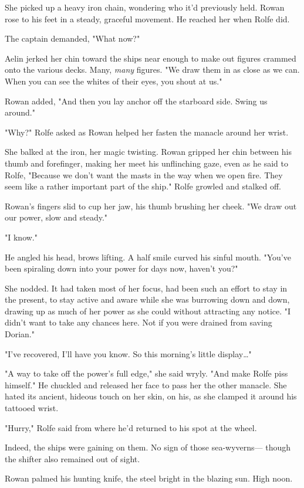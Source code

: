 She picked up a heavy iron chain, wondering who it'd previously held.
Rowan rose to his feet in a steady, graceful movement.
He reached her when Rolfe did.

The captain demanded, "What now?"

Aelin jerked her chin toward the ships near enough to make out figures crammed onto the various decks.
Many, \emph{many} figures.
"We draw them in as close as we can.
When you can see the whites of their eyes, you shout at us."

Rowan added, "And then you lay anchor off the starboard side.
Swing us around."

"Why?"
Rolfe asked as Rowan helped her fasten the manacle around her wrist.

She balked at the iron, her magic twisting.
Rowan gripped her chin between his thumb and forefinger, making her meet his unflinching gaze, even as he said to Rolfe, "Because we don't want the masts in the way when we open fire.
They seem like a rather important part of the ship."
Rolfe growled and stalked off.

Rowan's fingers slid to cup her jaw, his thumb brushing her cheek.
"We draw out our power, slow and steady."

"I know."

He angled his head, brows lifting.
A half smile curved his sinful mouth.
"You've been spiraling down into your power for days now, haven't you?"

She nodded.
It had taken most of her focus, had been such an effort to stay in the present, to stay active and aware while she was burrowing down and down, drawing up as much of her power as she could without attracting any notice.
"I didn't want to take any chances here.
Not if you were drained from saving Dorian."

"I've recovered, I'll have you know.
So this morning's little display\ldots"

"A way to take off the power's full edge," she said wryly.
"And make Rolfe piss himself."
He chuckled and released her face to pass her the other manacle.
She hated its ancient, hideous touch on her skin, on his, as she clamped it around his tattooed wrist.

"Hurry," Rolfe said from where he'd returned to his spot at the wheel.

Indeed, the ships were gaining on them.
No sign of those sea-wyverns--- though the shifter also remained out of sight.

Rowan palmed his hunting knife, the steel bright in the blazing sun.
High noon.

